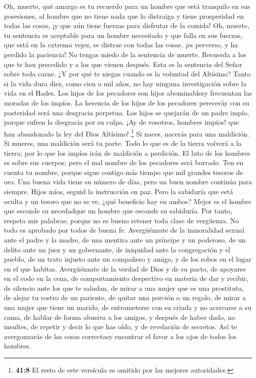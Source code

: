  Oh, muerte, qué amargo es tu recuerdo para un hombre que
está tranquilo en sus posesiones, al hombre que no tiene nada que lo
distraiga y tiene prosperidad en todas las cosas, ¡y que aún tiene
fuerzas para disfrutar de la comida!  Oh, muerte, tu
sentencia es aceptable para un hombre necesitado y que falla en sus
fuerzas, que está en la extrema vejez, se distrae con todas las cosas,
¡es perverso, y ha perdido la paciencia!  No tengas miedo
de la sentencia de muerte. Recuerda a los que te han precedido y a los
que vienen después. Esta es la sentencia del Señor sobre toda carne.
 ¿Y por qué te niegas cuando es la voluntad del Altísimo?
Tanto si la vida dura diez, como cien o mil años, no hay ninguna
investigación sobre la vida en el Hades.  Los hijos de los
pecadores son hijos abominablesy frecuentan las moradas de los impíos.
 La herencia de los hijos de los pecadores pereceráy con
su posteridad será una desgracia perpetua.  Los hijos se
quejarán de un padre impío, porque sufren la desgracia por su culpa.
 ¡Ay de vosotros, hombres impíos! que han abandonado la
ley del Dios Altísimo! \footnote{\textbf{41:8} El resto de este
  versículo es omitido por las mejores autoridades.}  Si
naces, nacerás para una maldición. Si mueres, una maldición será tu
parte.  Todo lo que es de la tierra volverá a la tierra;
por lo que los impíos irán de maldición a perdición.  El
luto de los hombres es sobre sus cuerpos; pero el mal nombre de los
pecadores será borrado.  Ten en cuenta tu nombre, porque
sigue contigo más tiempo que mil grandes tesoros de oro. 
Una buena vida tiene su número de días, pero un buen nombre continúa
para siempre.  Hijos míos, seguid la instrucción en paz.
Pero la sabiduría que está oculta y un tesoro que no se ve, ¿qué
beneficio hay en ambos?  Mejor es el hombre que esconde
su necedadque un hombre que esconde su sabiduría.  Por
tanto, respeta mis palabras; porque no es bueno retener toda clase de
vergüenza. No todo es aprobado por todos de buena fe. 
Avergüénzate de la inmoralidad sexual ante el padre y la madre, de una
mentira ante un príncipe y un poderoso,  de un delito
ante un juez y un gobernante, de iniquidad ante la congregación y el
pueblo, de un trato injusto ante un compañero y amigo,  y
de los robos en el lugar en el que habitas. Avergüénzate de la verdad de
Dios y de su pacto, de apoyarse en el codo en la cena, de comportamiento
despectivo en materia de dar y recibir,  de silencio ante
los que te saludan, de mirar a una mujer que es una prostituta,
 de alejar tu rostro de un pariente, de quitar una
porción o un regalo, de mirar a una mujer que tiene un marido,
 de entrometerse con su criada y no acercarse a su cama,
de hablar de forma abusiva a los amigos, y después de haber dado, no
insultes,  de repetir y decir lo que has oído, y de
revelación de secretos.  Así te avergonzarás de las cosas
correctasy encontrar el favor a los ojos de todos los hombres.

